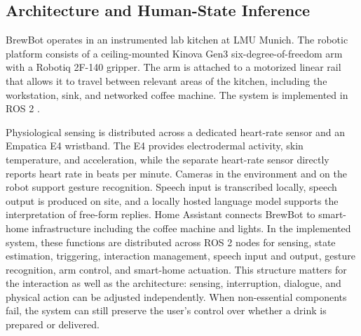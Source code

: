 \subsection{Architecture and Human-State Inference}

BrewBot operates in an instrumented lab kitchen at LMU Munich. The robotic
platform consists of a ceiling-mounted Kinova Gen3 six-degree-of-freedom arm
with a Robotiq 2F-140 gripper. The arm is attached to a motorized linear rail
that allows it to travel between relevant areas of the kitchen, including the
workstation, sink, and networked coffee machine. The system is implemented in
ROS 2 \cite{macenski2022ros2}.

Physiological sensing is distributed across a dedicated heart-rate sensor and an
Empatica E4 wristband. The E4 provides electrodermal activity, skin temperature,
and acceleration, while the separate heart-rate sensor directly reports heart
rate in beats per minute. Cameras in the environment and on the robot support gesture
recognition. Speech input is transcribed locally, speech output is produced
on site, and a locally hosted language model supports the interpretation of
free-form replies. Home Assistant connects BrewBot to smart-home infrastructure
including the coffee machine and lights. In the implemented system, these functions 
are distributed across ROS 2 nodes for sensing, state estimation, triggering, 
interaction management, speech input and output, gesture recognition, arm control, 
and smart-home actuation. This structure matters for the interaction as well as the 
architecture: sensing, interruption, dialogue, and physical action can be adjusted 
independently. When non-essential components fail, the system can still preserve 
the user's control over whether a drink is prepared or delivered.

